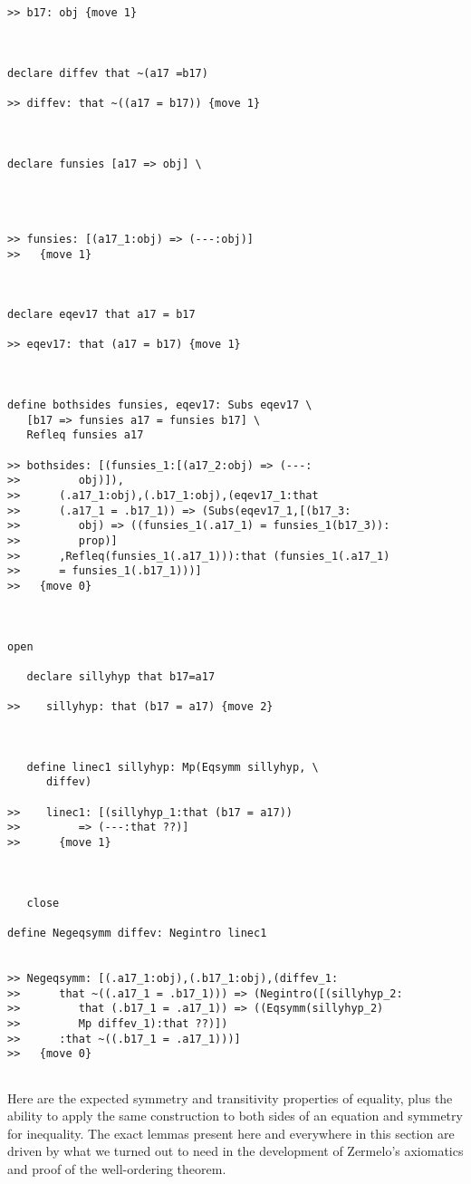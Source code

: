\documentclass[12pt]{article}
\begin{document}
\begin{verbatim}
>> b17: obj {move 1}



declare diffev that ~(a17 =b17)

>> diffev: that ~((a17 = b17)) {move 1}



declare funsies [a17 => obj] \
   



>> funsies: [(a17_1:obj) => (---:obj)]
>>   {move 1}



declare eqev17 that a17 = b17

>> eqev17: that (a17 = b17) {move 1}



define bothsides funsies, eqev17: Subs eqev17 \
   [b17 => funsies a17 = funsies b17] \
   Refleq funsies a17

>> bothsides: [(funsies_1:[(a17_2:obj) => (---:
>>         obj)]),
>>      (.a17_1:obj),(.b17_1:obj),(eqev17_1:that
>>      (.a17_1 = .b17_1)) => (Subs(eqev17_1,[(b17_3:
>>         obj) => ((funsies_1(.a17_1) = funsies_1(b17_3)):
>>         prop)]
>>      ,Refleq(funsies_1(.a17_1))):that (funsies_1(.a17_1)
>>      = funsies_1(.b17_1)))]
>>   {move 0}



open

   declare sillyhyp that b17=a17

>>    sillyhyp: that (b17 = a17) {move 2}



   define linec1 sillyhyp: Mp(Eqsymm sillyhyp, \
      diffev)

>>    linec1: [(sillyhyp_1:that (b17 = a17))
>>         => (---:that ??)]
>>      {move 1}



   close

define Negeqsymm diffev: Negintro linec1


>> Negeqsymm: [(.a17_1:obj),(.b17_1:obj),(diffev_1:
>>      that ~((.a17_1 = .b17_1))) => (Negintro([(sillyhyp_2:
>>         that (.b17_1 = .a17_1)) => ((Eqsymm(sillyhyp_2)
>>         Mp diffev_1):that ??)])
>>      :that ~((.b17_1 = .a17_1)))]
>>   {move 0}


\end{verbatim}

Here are the expected symmetry and transitivity properties of equality, plus the ability to apply the same construction to both sides of an equation and symmetry for inequality.  The exact lemmas present here and everywhere in this section are driven by what we turned out to need in the development of Zermelo's axiomatics and proof of the well-ordering theorem.
\end{document}
